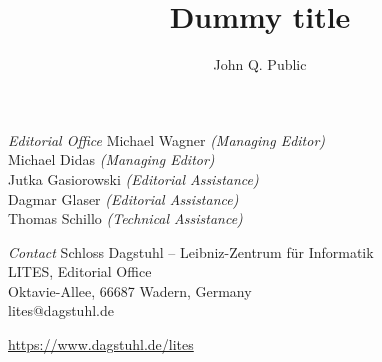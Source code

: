 \documentclass[a4paper,UKenglish]{litesmaster-v2021}
\begin{document}
\begin{publicationinfo}
\bigskip
\emph{Editorial Office}\newline
Michael Wagner \emph{(Managing Editor)}\\
Michael Didas \emph{(Managing Editor)}\\
Jutka Gasiorowski \emph{(Editorial Assistance)}\\
Dagmar Glaser \emph{(Editorial Assistance)}\\
Thomas Schillo \emph{(Technical Assistance)}

\bigskip
\emph{Contact}\newline
Schloss Dagstuhl -- Leibniz-Zentrum f\"ur Informatik\\
LITES, Editorial Office\\
Oktavie-Allee, 66687 Wadern, Germany\\ 
lites@dagstuhl.de


\vfill

\url{https://www.dagstuhl.de/lites}
 
 \thispagestyle{empty}
 \onecolumn
\end{publicationinfo}


\begin{contentslist}

\contitem
\title{Dummy title}
\author{John Q. Public}

\end{contentslist}
\end{document}
